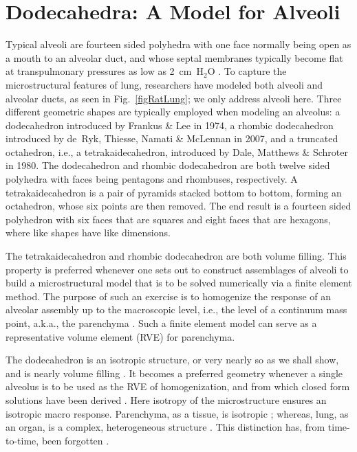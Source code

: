 \part{Dodecahedra: A Model for Alveoli}
\label{partDodecahedron}

Typical alveoli are fourteen sided polyhedra with one face normally being open as a mouth to an alveolar duct, and whose septal membranes typically become flat at trans\-pulmonary pressures as low as 2~cm~$\text{H}_2\text{O}$ \cite{HoppinHildebrandt77}.  To capture the micro\-structural features of lung, researchers have modeled both alveoli and alveolar ducts, as seen in Fig.~\ref{figRatLung}; we only address alveoli here.  Three different geometric shapes are typically employed when modeling an alveolus: a dodecahedron introduced by Frankus \& Lee \cite{FrankusLee74} in 1974, a rhombic dodecahedron introduced by de~Ryk, Thiesse, Namati \& McLennan \cite{Ryketal07} in 2007, and a truncated octahedron, i.e., a tetrakaidecahedron, introduced by Dale, Matthews \& Schroter \cite{Daleetal80} in 1980.  The dodecahedron and rhombic dodecahedron are both twelve sided polyhedra with faces being pentagons and rhombuses, respectively.  A tetrakaidecahedron is a pair of pyramids stacked bottom to bottom, forming an octahedron, whose six points are then removed.  The end result is a fourteen sided polyhedron with six faces that are squares and eight faces that are hexagons, where like shapes have like dimensions.

The tetrakaidecahedron and rhombic dodecahedron are both volume filling.  This property is preferred whenever one sets out to construct assemblages of alveoli to build a micro\-structural model that is to be solved numerically via a finite element method.  The purpose of such an exercise is to homogenize the response of an alveolar assembly up to the macroscopic level, i.e., the level of a continuum mass point, a.k.a., the parenchyma \cite{Daleetal80,DennySchroter95,DennySchroter97,DennySchroter00,Koweetal86,Ryketal07,Chenetal14}.  Such a finite element model can serve as a representative volume element (RVE) for parenchyma.

The dodecahedron is an isotropic structure, or very nearly so as we shall show, and is nearly volume filling \cite{Kimmeletal87}.  It becomes a preferred geometry whenever a single alveolus is to be used as the RVE of homo\-genization, and from which closed form solutions have been derived \cite{BudianskyKimmel87,KimmelBudiansky90,Kimmeletal87,Freedetal12}.  Here isotropy of the microstructure ensures an isotropic macro response.  Parenchyma, as a tissue, is isotropic \cite{Weedetal15,Fung88,Hughesetal72}; whereas, lung, as an organ, is a complex, heterogeneous structure \cite{Mead73,West07}.  This distinction has, from time-to-time, been forgotten \cite{DennySchroter06}.  

